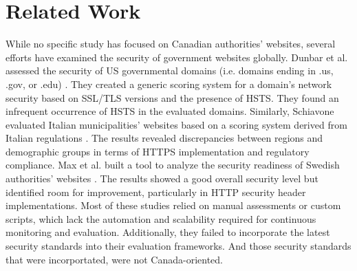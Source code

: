 \documentclass[pdflatex,sn-mathphys-num]{sn-jnl}
\numberwithin{equation}{section}
\theoremstyle{thmstyleone}
\theoremstyle{thmstyletwo}%
\theoremstyle{thmstylethree}%
\begin{document}


\section{Related Work}\label{sec:related-work}


\vspace{1em}While no specific study has focused on Canadian authorities' websites, several efforts have 
examined the security of government websites globally.     
Dunbar et al. assessed the security of US governmental domains (i.e. domains ending in .us, 
.gov, or .edu) \cite{dunbar4240917survey}. 
They created a generic scoring system for a domain's network security based on SSL/TLS 
versions and the presence of HSTS. They found an infrequent occurrence of HSTS in the evaluated 
domains. 
Similarly, Schiavone evaluated Italian municipalities' websites based on a scoring system derived 
from Italian regulations \cite{schiavone2024municipality2https}. The results 
revealed discrepancies between regions and demographic groups in terms of HTTPS implementation 
and regulatory compliance. Max et al. built a tool to analyze the security readiness of 
Swedish authorities' websites \cite{valdaserides2024automated}. The results showed a good overall security
 level but identified room for improvement, particularly in HTTP security header implementations. 
Most of these studies relied on manual assessments or custom scripts, which lack the automation 
and scalability required for continuous monitoring and evaluation. Additionally, they
 failed to incorporate the latest security standards into their evaluation frameworks. 
 And those security standards that were incorportated, were not Canada-oriented. 
\end{document}
